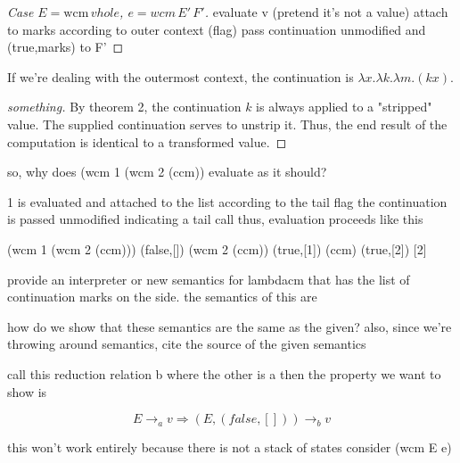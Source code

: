 \documentclass[ms,electronic,twosidetoc,letterpaper,chaptercenter,parttop]{byumsphd}
\begin{document}
\begin{proof}[Case $E=\mathrm{wcm}\,v hole$, $e=wcm\,E'\,F'$]
evaluate v (pretend it's not a value)
attach to marks according to outer context (flag)
pass continuation unmodified and (true,marks) to F'


\end{proof}

If we're dealing with the outermost context, the continuation is $\lambda x.\lambda k.\lambda m.(k x)$.

\begin{proof}[something]
By theorem 2, the continuation $k$ is always applied to a "stripped" value. The supplied continuation serves to unstrip it. Thus, the end result of the computation is identical to a transformed value.
\end{proof}

so, why does (wcm 1 (wcm 2 (ccm)) evaluate as it should?

1 is evaluated and attached to the list according to the tail flag
the continuation is passed unmodified indicating a tail call
thus, evaluation proceeds like this

(wcm 1 (wcm 2 (ccm))) (false,[])
(wcm 2 (ccm)) (true,[1])
(ccm) (true,[2])
[2]

provide an interpreter or new semantics for lambdacm that has the list of continuation 
marks on the side. the semantics of this are


how do we show that these semantics are the same as the given?
also, since we're throwing around semantics, cite the source of the given semantics

call this reduction relation b where the other is a
then the property we want to show is

\[
E\rightarrow_{a}v\Rightarrow(E,(false,[]))\rightarrow_{b}v
\]

this won't work entirely because there is not a stack of states
consider (wcm E e)
\end{document}
